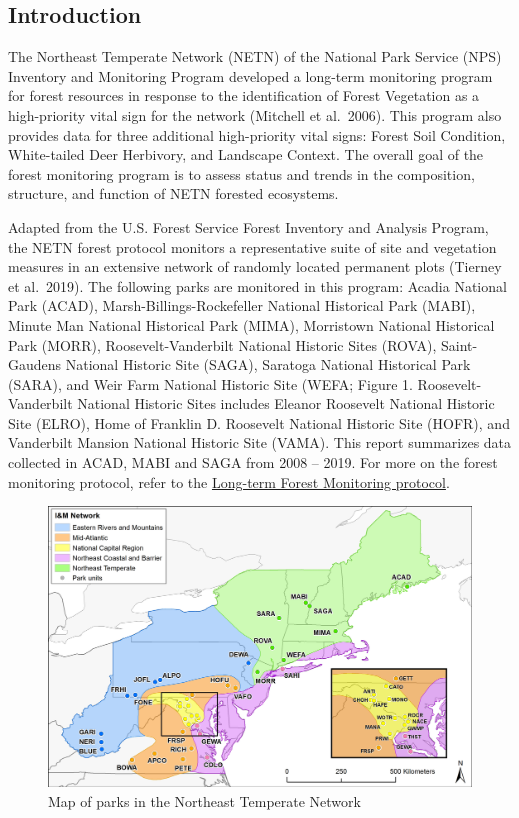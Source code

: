 \documentclass[
  10.5pt,
]{article}
\author{}
\date{\vspace{-2.5em}}
\begin{document}
\hypertarget{introduction}{%
\subsection{Introduction}\label{introduction}}

The Northeast Temperate Network (NETN) of the National Park Service (NPS) Inventory and Monitoring Program developed a long-term monitoring program for forest resources in response to the identification of Forest Vegetation as a high-priority vital sign for the network (Mitchell et al.~2006). This program also provides data for three additional high-priority vital signs: Forest Soil Condition, White-tailed Deer Herbivory, and Landscape Context. The overall goal of the forest monitoring program is to assess status and trends in the composition, structure, and function of NETN forested ecosystems.

Adapted from the U.S. Forest Service Forest Inventory and Analysis Program, the NETN forest protocol monitors a representative suite of site and vegetation measures in an extensive network of randomly located permanent plots (Tierney et al.~2019). The following parks are monitored in this program: Acadia National Park (ACAD), Marsh-Billings-Rockefeller National Historical Park (MABI), Minute Man National Historical Park (MIMA), Morristown National Historical Park (MORR), Roosevelt-Vanderbilt National Historic Sites (ROVA), Saint-Gaudens National Historic Site (SAGA), Saratoga National Historical Park (SARA), and Weir Farm National Historic Site (WEFA; Figure 1. Roosevelt-Vanderbilt National Historic Sites includes Eleanor Roosevelt National Historic Site (ELRO), Home of Franklin D. Roosevelt National Historic Site (HOFR), and Vanderbilt Mansion National Historic Site (VAMA). This report summarizes data collected in ACAD, MABI and SAGA from 2008 -- 2019. For more on the forest monitoring protocol, refer to the \href{https://irma.nps.gov/DataStore/Reference/Profile/2247950}{Long-term Forest Monitoring protocol}.

\begin{figure}

\includegraphics[width=0.5\linewidth]{./images/map_of_parks} \hfill{}

\caption{Map of parks in the Northeast Temperate Network}\label{fig:netnmap}
\end{figure}
\end{document}

